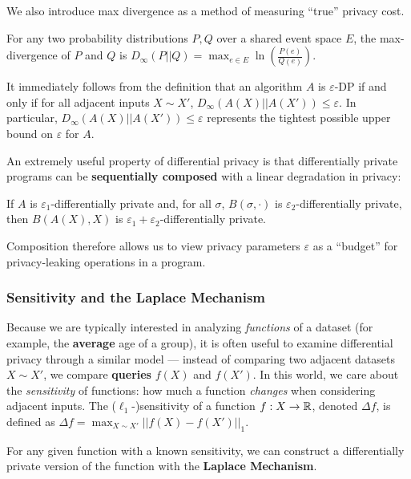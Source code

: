 We also introduce max divergence as a method of measuring ``true'' privacy cost. 

\begin{defn}
    For any two probability distributions $P, Q$ over a shared event space $E$, the max-divergence of $P$ and $Q$ is 
    $D_{\infty}(P||Q) = \max_{e\in E}\ln\left(\frac{P(e)}{Q(e)}\right)$.
\end{defn}

It immediately follows from the definition that an algorithm $A$ is $\varepsilon$-DP if and only if for all adjacent inputs $X\sim X'$, $D_{\infty}(A(X)||A(X'))\leq \varepsilon$. In particular, $D_{\infty}(A(X)||A(X'))\leq \varepsilon$ represents the tightest possible upper bound on $\varepsilon$ for $A$. 

An extremely useful property of differential privacy is that differentially private programs can be \textbf{sequentially composed} with a linear degradation in privacy:

\begin{thm}
    If $A$ is $\varepsilon_1$-differentially private and, for all $\sigma$, $B(\sigma, \cdot)$ is $\varepsilon_2$-differentially private, then $B(A(X), X)$ is $\varepsilon_1+\varepsilon_2$-differentially private. 
\end{thm}

Composition therefore allows us to view privacy parameters $\varepsilon$ as a ``budget'' for privacy-leaking operations in a program. 

\subsubsection{Sensitivity and the Laplace Mechanism}

Because we are typically interested in analyzing \textit{functions} of a dataset (for example, the \textbf{average} age of a group), it is often useful to examine differential privacy through a similar model --- instead of comparing two adjacent datasets $X\sim X'$, we compare \textbf{queries} $f(X)$ and $f(X')$. In this world, we care about the \textit{sensitivity} of functions: how much a function \textit{changes} when considering adjacent inputs. 
The ($\ell_1$-)sensitivity of a function $f: X\to \mathbb{R}$, denoted $\Delta f$, is defined as $\Delta f = \max_{X\sim X'}||f(X)-f(X')||_1$.

For any given function with a known sensitivity, we can construct a differentially private version of the function with the \textbf{Laplace Mechanism}. 

